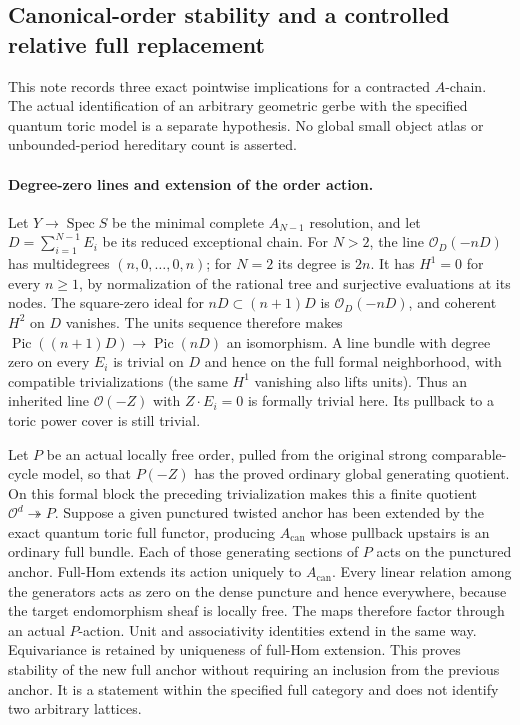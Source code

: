 \subsection*{Canonical-order stability and a controlled relative full replacement}

This note records three exact pointwise implications for a contracted
$A$-chain. The actual identification of an arbitrary geometric gerbe with
the specified quantum toric model is a separate hypothesis. No global
small object atlas or unbounded-period hereditary count is asserted.

\paragraph{Degree-zero lines and extension of the order action.}
Let $Y\to\operatorname{Spec}S$ be the minimal complete $A_{N-1}$
resolution, and let $D=\sum_{i=1}^{N-1}E_i$ be its reduced exceptional
chain. For $N>2$, the line $\mathcal O_D(-nD)$ has multidegrees
$(n,0,\ldots,0,n)$; for $N=2$ its degree is $2n$.
It has $H^1=0$ for every $n\ge1$, by normalization of the rational tree
and surjective evaluations at its nodes. The square-zero ideal for
$nD\subset(n+1)D$ is $\mathcal O_D(-nD)$, and coherent $H^2$ on $D$
vanishes. The units sequence therefore makes
$\operatorname{Pic}((n+1)D)\to\operatorname{Pic}(nD)$ an isomorphism.
A line bundle with degree zero on every $E_i$ is trivial on $D$ and
hence on the full formal neighborhood, with compatible trivializations
(the same $H^1$ vanishing also lifts units). Thus an inherited line
$\mathcal O(-Z)$ with $Z\cdot E_i=0$ is formally trivial here. Its
pullback to a toric power cover is still trivial.

Let $P$ be an actual locally free order, pulled from the original strong
comparable-cycle model, so that $P(-Z)$ has the proved ordinary global
generating quotient. On this formal block the preceding trivialization
makes this a finite quotient $\mathcal O^d\twoheadrightarrow P$.
Suppose a given punctured twisted anchor has been extended by the exact
quantum toric full functor, producing $A_{\mathrm{can}}$ whose pullback
upstairs is an ordinary full bundle. Each of those generating sections
of $P$ acts on the punctured anchor. Full-Hom extends its action uniquely
to $A_{\mathrm{can}}$. Every linear relation among the generators acts
as zero on the dense puncture and hence everywhere, because the target
endomorphism sheaf is locally free. The maps therefore factor through
an actual $P$-action. Unit and associativity identities extend in the
same way. Equivariance is retained by uniqueness of full-Hom extension.
This proves stability of the new full anchor without requiring an
inclusion from the previous anchor. It is a statement within the
specified full category and does not identify two arbitrary lattices.

